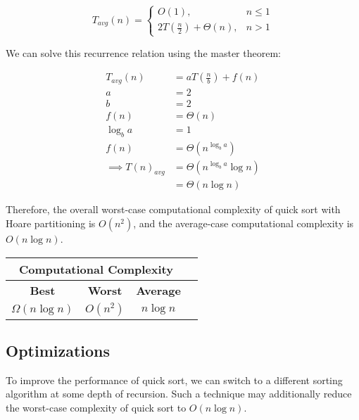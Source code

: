 \begin{equation*}
    T_{avg}(n) = \begin{cases}
        O(1), & n \leq 1 \\
        2T\left(\frac{n}{2}\right) + \Theta(n), & n > 1
    \end{cases}
\end{equation*}

We can solve this recurrence relation using the master theorem:

\begin{equation*}
    \begin{aligned}
        T_{avg}(n) &= aT\left(\frac{n}{b}\right) + f(n) \\
        a &= 2 \\
        b &= 2 \\
        f(n) &= \Theta(n) \\
        \log_b a &= 1 \\
        f(n) &= \Theta(n^{\log_b a}) \\
        \implies T(n)_{avg} &= \Theta(n^{\log_b a} \log n) \\
        &= \Theta(n \log n)
    \end{aligned}
\end{equation*}

Therefore, the overall worst-case computational complexity of quick sort with Hoare partitioning is $O(n^2)$, and the average-case computational complexity is $O(n\log n)$.

\begin{table}[h]
    \centering
    \begin{tabular}{|c|c|c|c|}
        \hline
        \multicolumn{3}{|c|}{Computational Complexity} \\
        \hline
        \textbf{Best} & \textbf{Worst} & \textbf{Average} \\
        \hline
        \small$\Omega(n \log n)$ & \small$O(n^2)$ & \small$n \log n$ \\
        \hline
    \end{tabular}
\end{table}

\subsection{Optimizations}

To improve the performance of quick sort, we can switch to a different sorting algorithm at some depth of recursion. Such a technique may additionally reduce the worst-case complexity of quick sort to $O(n \log n)$.

